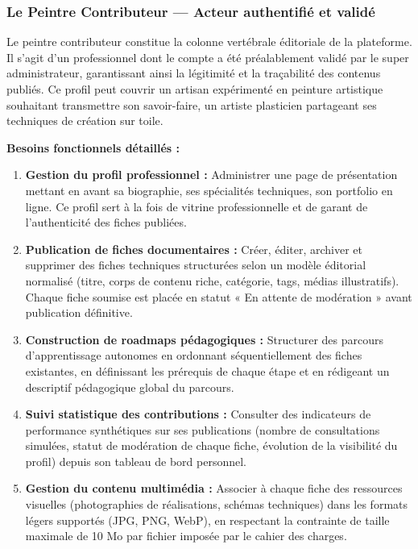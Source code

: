\documentclass[12pt,a4paper]{report}
\begin{document}
\subsubsection*{Le Peintre Contributeur — Acteur authentifié et validé}

\noindent
Le peintre contributeur constitue la colonne vertébrale éditoriale de la plateforme. Il s'agit d'un professionnel dont le compte a été préalablement validé par le super administrateur, garantissant ainsi la légitimité et la traçabilité des contenus publiés. Ce profil peut couvrir un artisan expérimenté en peinture artistique souhaitant transmettre son savoir-faire, un artiste plasticien partageant ses techniques de création sur toile.

\vspace{0.5em}
\textbf{Besoins fonctionnels détaillés :}

\begin{enumerate}[leftmargin=1.5cm, label=\textbf{BF-\arabic*.}, itemsep=5pt]
    \item \textbf{Gestion du profil professionnel :} Administrer une page de présentation mettant en avant sa biographie, ses spécialités techniques, son portfolio en ligne. Ce profil sert à la fois de vitrine professionnelle et de garant de l'authenticité des fiches publiées.
    \item \textbf{Publication de fiches documentaires :} Créer, éditer, archiver et supprimer des fiches techniques structurées selon un modèle éditorial normalisé (titre, corps de contenu riche, catégorie, tags, médias illustratifs). Chaque fiche soumise est placée en statut « En attente de modération » avant publication définitive.
    \item \textbf{Construction de roadmaps pédagogiques :} Structurer des parcours d'apprentissage autonomes en ordonnant séquentiellement des fiches existantes, en définissant les prérequis de chaque étape et en rédigeant un descriptif pédagogique global du parcours.
    \item \textbf{Suivi statistique des contributions :} Consulter des indicateurs de performance synthétiques sur ses publications (nombre de consultations simulées, statut de modération de chaque fiche, évolution de la visibilité du profil) depuis son tableau de bord personnel.
    \item \textbf{Gestion du contenu multimédia :} Associer à chaque fiche des ressources visuelles (photographies de réalisations, schémas techniques) dans les formats légers supportés (JPG, PNG, WebP), en respectant la contrainte de taille maximale de 10 Mo par fichier imposée par le cahier des charges.
\end{enumerate}
\end{document}
